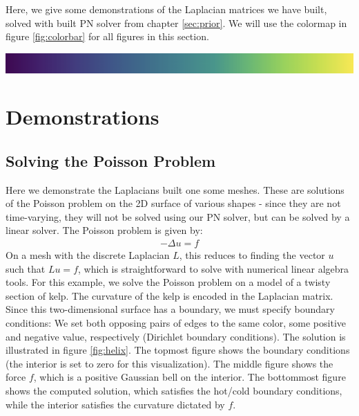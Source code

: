 \ifdefined\COMPILINGFROMMAIN
\else
    
    
\fi
\noindent
Here, we give some demonstrations of the Laplacian matrices we have built, solved with built PN solver from chapter \ref{sec:prior}. We will use the colormap in figure \ref{fig:colorbar} for all figures in this section.
\\
\begin{center}
    \includegraphics[width=1.0\columnwidth]{../images/colorbar.png}
    \label{fig:colorbar}
\end{center}
\noindent

\section{Demonstrations}
\subsection*{Solving the Poisson Problem}
Here we demonstrate the Laplacians built one some meshes. These are solutions of the Poisson problem on the 2D surface of various shapes - since they are not time-varying, they will not be solved using our PN solver, but can be solved by a linear solver. The Poisson problem is given by:
\begin{align}
    -\Delta u = f
\end{align}
On a mesh with the discrete Laplacian $L$, this reduces to finding the vector $u$ such that $Lu = f$, which is straightforward to solve with numerical linear algebra tools. For this example, we solve the Poisson problem on a model of a twisty section of kelp. The curvature of the kelp is encoded in the Laplacian matrix. Since this two-dimensional surface has a boundary, we must specify boundary conditions: We set both opposing pairs of edges to the same color, some positive and negative value, respectively (Dirichlet boundary conditions). The solution is illustrated in figure \ref{fig:helix}. The topmost figure shows the boundary conditions (the interior is set to zero for this visualization). The middle figure shows the force $f$, which is a positive Gaussian bell on the interior. The bottommost figure shows the computed solution, which satisfies the hot/cold boundary conditions, while the interior satisfies the curvature dictated by $f$.


